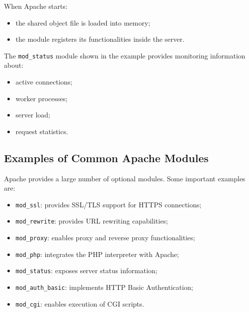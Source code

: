 \documentclass{scrbook}
\begin{document}
	When Apache starts:
	\begin{itemize}
		\item the shared object file is loaded into memory;
		
		\item the module registers its functionalities inside the server.
	\end{itemize}
	
	The \texttt{mod\_status} module shown in the example provides monitoring information about:
	\begin{itemize}
		\item active connections;
		
		\item worker processes;
		
		\item server load;
		
		\item request statistics.
	\end{itemize}
	
	\subsection{Examples of Common Apache Modules}
	
	Apache provides a large number of optional modules. Some important examples are:
	
	\begin{itemize}
		\item \texttt{mod\_ssl}: provides SSL/TLS support for HTTPS connections;
		
		\item \texttt{mod\_rewrite}: provides URL rewriting capabilities;
		
		\item \texttt{mod\_proxy}: enables proxy and reverse proxy functionalities;
		
		\item \texttt{mod\_php}: integrates the PHP interpreter with Apache;
		
		\item \texttt{mod\_status}: exposes server status information;
		
		\item \texttt{mod\_auth\_basic}: implements HTTP Basic Authentication;
		
		\item \texttt{mod\_cgi}: enables execution of CGI scripts.
	\end{itemize}
	
\end{document}
